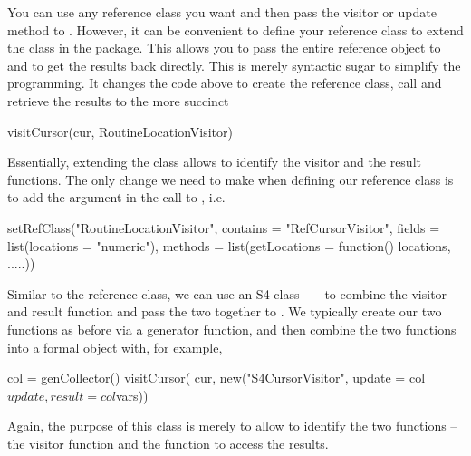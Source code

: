 You can use any reference class you want and then pass the visitor or
update method to .  However, it can be convenient to
define your reference class to extend the  class in
the  package. This allows you to pass the entire
reference object to  and to get the results back
directly. This is merely syntactic sugar to simplify the
programming. It changes the code above to create the reference class,
call  and retrieve the results to the more succinct
\begin{RCode}
visitCursor(cur, RoutineLocationVisitor)
\end{RCode}
Essentially, extending the  class allows
 to identify the visitor and the result functions.
The only change we need to make when defining our reference class
is to add the  argument in the call to
, i.e.
\begin{RCode}
setRefClass("RoutineLocationVisitor",
            contains = "RefCursorVisitor",
            fields = list(locations = "numeric"),
            methods = list(getLocations = function() locations,
                       .....))
\end{RCode}



Similar to the  reference class, we can use
an S4 class --  -- to combine the visitor and
result function and pass the two together to .  We
typically create our two functions as before via a generator function,
and then combine the two functions into a formal object with, for
example,
\begin{RCode}
col = genCollector()
visitCursor( cur, new("S4CursorVisitor",  update = col$update, result = col$vars))
\end{RCode}
Again, the purpose of this  class is merely to
allow  to identify the two functions -- the visitor
function and the function to access the results.

